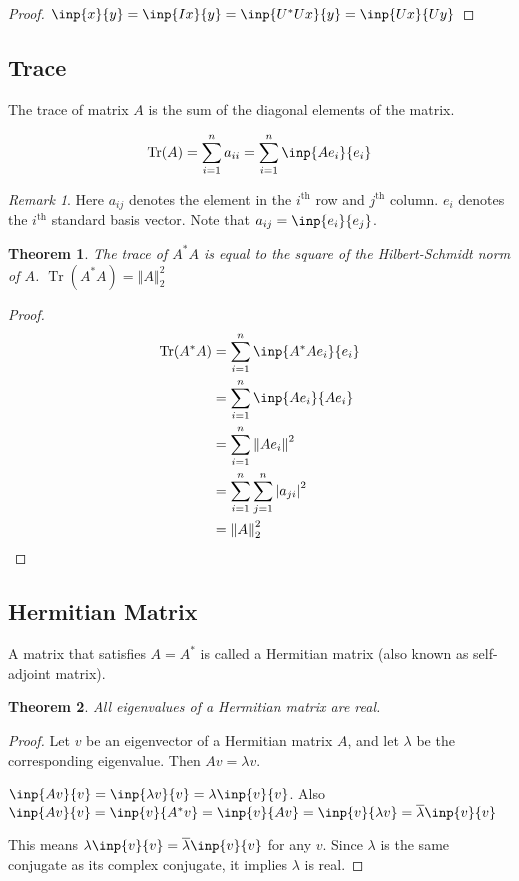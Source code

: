 \documentclass[twofold]{article}
\newcommand*\conj[1]{\overline{#1}}
\newcommand*\adj[1]{#1^*}
\newcommand*\norm[1]{\left \Vert #1 \right\Vert}
\newcommand*\abs[1]{\left \vert #1 \right\vert}
\DeclareMathOperator{\Tr}{Tr}
\theoremstyle{plain}
\newtheorem{theorem}{Theorem}
\theoremstyle{definition}
\theoremstyle{remark}
\newtheorem*{remark}{Remark}
\begin{document}
\begin{proof} \(\inp{x}{y} = \inp{Ix}{y} = \inp{\adj{U}U x}{y} = \inp{Ux}{Uy}\) \end{proof}

\subsection{Trace}
The trace of matrix \(A\) is the sum of the diagonal elements of the matrix.

\[\Tr(A) = \sum_{i=1} ^n a_{ii} = \sum_{i=1} ^n \inp{Ae_i}{ e_i}\]

\begin{remark}Here \(a_{ij}\) denotes the element in the \(i^{\text{th}}\) row and \(j^{\text{th}}\) column. \(e_i\) denotes the \(i^{\text{th}}\) standard basis vector. Note that \(a_{ij} = \inp{e_i}{e_j}\).\end{remark}

\begin{theorem}The trace of \(\adj{A}A\) is equal to the square of the Hilbert-Schmidt norm of \(A\). \(\Tr( \adj{A} A ) = \norm{A}_2^2\)\end{theorem}
\begin{proof} \begin{equation*} \begin{split} 
\Tr(\adj{A} A) & = \sum_{i=1}^n \inp{\adj{A}A e_i}{e_i} \\
& = \sum_{i=1} ^n \inp{Ae_i}{Ae_i} \\
& = \sum_{i=1} ^n \norm{Ae_i}^2 \\
& = \sum_{i=1} ^n \sum_{j=1} ^n \abs{a_{ji}}^2 \\
& = \norm{A}^2_2
\end{split} \end{equation*}
 \end{proof}

\subsection{Hermitian Matrix}
A matrix that satisfies \(A = \adj{A}\) is called a Hermitian matrix (also known as self-adjoint matrix). 

\begin{theorem} \label{herm_eig_real} All eigenvalues of a Hermitian matrix are real. \end{theorem}

\begin{proof}
Let \(v\) be an eigenvector of a Hermitian matrix \(A\), and let \(\lambda\) be the corresponding eigenvalue. Then \(Av = \lambda v\). 

\(\inp{Av}{v} = \inp{\lambda v}{v} = \lambda\inp{v}{v}\). Also \(\inp{Av}{v} = \inp{v}{\adj{A}v} = \inp{v}{Av} = \inp{v}{\lambda v} = \conj{\lambda} \inp{v}{v}\)

This means \(\lambda \inp{v}{v} = \conj{\lambda} \inp{v}{v}\) for any \(v\). Since \(\lambda\) is the same conjugate as its complex conjugate, it implies \(\lambda\) is real. 
 \end{proof}
\end{document}
